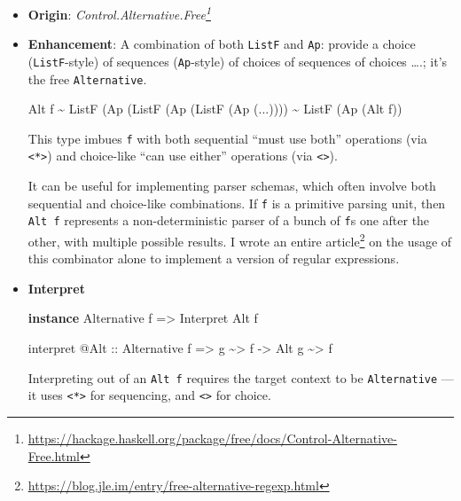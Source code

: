 \documentclass[]{article}
\newenvironment{Shaded}{}{}
\newcommand{\DataTypeTok}[1]{\textcolor[rgb]{0.56,0.13,0.00}{#1}}
\newcommand{\KeywordTok}[1]{\textcolor[rgb]{0.00,0.44,0.13}{\textbf{#1}}}
\newcommand{\NormalTok}[1]{#1}
\newcommand{\OperatorTok}[1]{\textcolor[rgb]{0.40,0.40,0.40}{#1}}
\newcommand{\OtherTok}[1]{\textcolor[rgb]{0.00,0.44,0.13}{#1}}
\renewcommand{\href}[2]{#2\footnote{\url{#1}}}
\begin{document}
\begin{itemize}
\item
  \textbf{Origin}:
  \emph{\href{https://hackage.haskell.org/package/free/docs/Control-Alternative-Free.html}{Control.Alternative.Free}}
\item
  \textbf{Enhancement}: A combination of both \texttt{ListF} and \texttt{Ap}:
  provide a choice (\texttt{ListF}-style) of sequences (\texttt{Ap}-style) of
  choices of sequences of choices \ldots.; it's the free \texttt{Alternative}.

\begin{Shaded}
\begin{Highlighting}[]
\DataTypeTok{Alt}\NormalTok{ f }\OperatorTok{\textasciitilde{}} \DataTypeTok{ListF}\NormalTok{ (}\DataTypeTok{Ap}\NormalTok{ (}\DataTypeTok{ListF}\NormalTok{ (}\DataTypeTok{Ap}\NormalTok{ (}\DataTypeTok{ListF}\NormalTok{ (}\DataTypeTok{Ap}\NormalTok{ (}\OperatorTok{...}\NormalTok{))))}
      \OperatorTok{\textasciitilde{}} \DataTypeTok{ListF}\NormalTok{ (}\DataTypeTok{Ap}\NormalTok{ (}\DataTypeTok{Alt}\NormalTok{ f))}
\end{Highlighting}
\end{Shaded}

  This type imbues \texttt{f} with both sequential ``must use both'' operations
  (via \texttt{\textless{}*\textgreater{}}) and choice-like ``can use either''
  operations (via \texttt{\textless{}\textbar{}\textgreater{}}).

  It can be useful for implementing parser schemas, which often involve both
  sequential and choice-like combinations. If \texttt{f} is a primitive parsing
  unit, then \texttt{Alt\ f} represents a non-deterministic parser of a bunch of
  \texttt{f}s one after the other, with multiple possible results. I wrote
  \href{https://blog.jle.im/entry/free-alternative-regexp.html}{an entire
  article} on the usage of this combinator alone to implement a version of
  regular expressions.
\item
  \textbf{Interpret}

\begin{Shaded}
\begin{Highlighting}[]
\KeywordTok{instance} \DataTypeTok{Alternative}\NormalTok{ f }\OtherTok{=>} \DataTypeTok{Interpret} \DataTypeTok{Alt}\NormalTok{ f}

\NormalTok{interpret }\OperatorTok{@}\DataTypeTok{Alt}
\OtherTok{    ::} \DataTypeTok{Alternative}\NormalTok{ f}
    \OtherTok{=>}\NormalTok{ g }\OperatorTok{\textasciitilde{}>}\NormalTok{ f}
    \OtherTok{{-}>} \DataTypeTok{Alt}\NormalTok{ g }\OperatorTok{\textasciitilde{}>}\NormalTok{ f}
\end{Highlighting}
\end{Shaded}

  Interpreting out of an \texttt{Alt\ f} requires the target context to be
  \texttt{Alternative} --- it uses \texttt{\textless{}*\textgreater{}} for
  sequencing, and \texttt{\textless{}\textbar{}\textgreater{}} for choice.
\end{itemize}
\end{document}
